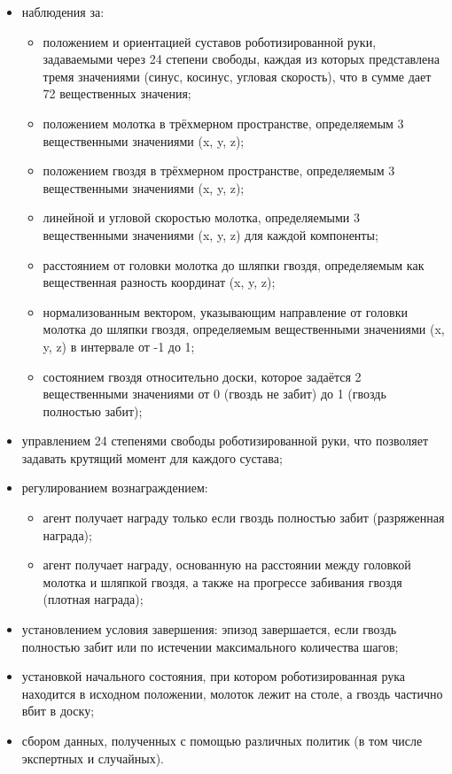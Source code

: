 \begin{itemize}
    \item наблюдения за:
        \begin{itemize}
        \item положением и ориентацией суставов роботизированной руки, задаваемыми через 24 степени свободы, 
        каждая из которых представлена тремя значениями (синус, косинус, угловая скорость), что в сумме дает 72 вещественных значения;
        \item положением молотка в трёхмерном пространстве, определяемым 3 вещественными значениями (x, y, z);
        \item положением гвоздя в трёхмерном пространстве, определяемым 3 вещественными значениями (x, y, z);
        \item линейной и угловой скоростью молотка, определяемыми 3 вещественными значениями (x, y, z) для каждой компоненты;
        \item расстоянием от головки молотка до шляпки гвоздя, определяемым как вещественная разность координат (x, y, z);
        \item нормализованным вектором, указывающим направление от головки молотка до шляпки гвоздя, определяемым вещественными значениями (x, y, z) в интервале от -1 до 1;
        \item состоянием гвоздя относительно доски, которое задаётся 2 вещественными значениями от 0 (гвоздь не забит) до 1 (гвоздь полностью забит);
        \end{itemize}
    \item управлением 24 степенями свободы роботизированной руки, что позволяет задавать крутящий момент для каждого сустава;
    \item регулированием вознаграждением:
    \begin{itemize}
        \item агент получает награду только если гвоздь полностью забит (разряженная награда);
        \item агент получает награду, основанную на расстоянии между головкой молотка и шляпкой гвоздя, а также на прогрессе забивания гвоздя (плотная награда);
    \end{itemize}
    \item установлением условия завершения: эпизод завершается, если гвоздь полностью забит или по истечении максимального количества шагов;
    \item установкой начального состояния, при котором роботизированная рука находится в исходном положении, молоток лежит на столе, а гвоздь частично вбит в доску;
    \item сбором данных, полученных с помощью различных политик (в том числе экспертных и случайных).
\end{itemize}

